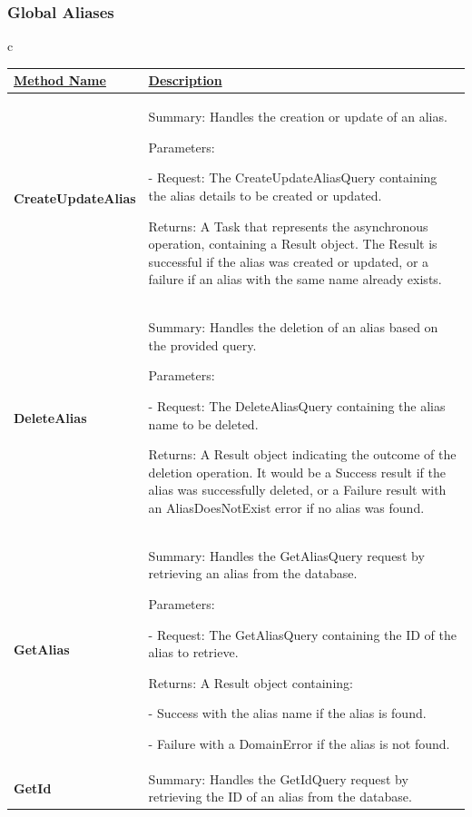 \subsubsection{Global Aliases}
\begin{longtable}{c}
    \renewcommand{\arraystretch}{1.2}
    \begin{tabular}{|p{0.25\linewidth}|p{0.75\linewidth}|}
\hline
    \underline{Method Name} & \underline{Description} 
\\
\hline
    \textbf{CreateUpdateAlias} & Summary: Handles the creation or update of an alias.
    
Parameters:

- Request: The CreateUpdateAliasQuery containing the alias details to be created or updated.

Returns: A Task that represents the asynchronous operation, containing a Result object. The Result is successful if the alias was created or updated, or a failure if an alias with the same name already exists.
\\
\hline
    \textbf{DeleteAlias} & Summary: Handles the deletion of an alias based on the provided query.
    
Parameters:

- Request: The DeleteAliasQuery containing the alias name to be deleted.

Returns: A Result object indicating the outcome of the deletion operation. It would be a Success result if the alias was successfully deleted, or a Failure result with an AliasDoesNotExist error if no alias was found.
\\
\hline
    \textbf{GetAlias} & Summary: Handles the GetAliasQuery request by retrieving an alias from the database.

Parameters:

- Request: The GetAliasQuery containing the ID of the alias to retrieve.

Returns: A Result object containing: 	

- Success with the alias name if the alias is found. 	

- Failure with a DomainError if the alias is not found.
\\
\hline
    \textbf{GetId} & Summary: Handles the GetIdQuery request by retrieving the ID of an alias from the database.
    

\end{tabular}
\end{longtable}
